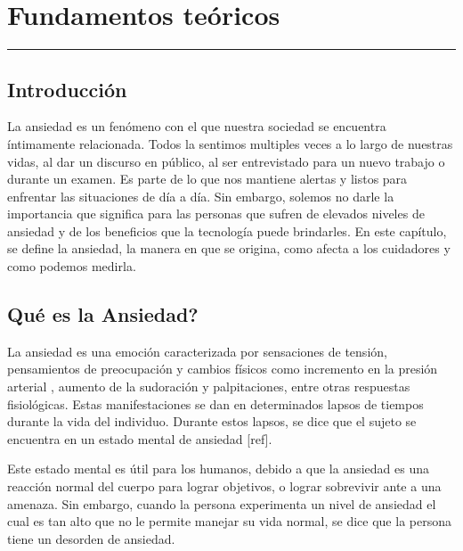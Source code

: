 \chapter{Fundamentos te\'oricos}\label{capit:cap2}
\vspace{-2.0325ex}%
\noindent
\rule{\textwidth}{0.5pt}
\vspace{-5.5ex}%
\newcommand{\pushline}{\Indp}%

\section{Introducci\'on}\label{secc:introduccion}
La ansiedad es un fen\'omeno con el que nuestra sociedad se encuentra \'intimamente relacionada. Todos la sentimos multiples veces a lo largo de nuestras vidas, al dar un discurso en p\'ublico, al ser entrevistado para un nuevo trabajo o durante un examen. Es parte de lo que nos mantiene alertas y listos para enfrentar las situaciones de d\'ia a d\'ia. Sin embargo, solemos no darle la importancia que significa para las personas que sufren de elevados niveles de ansiedad y de los beneficios que la tecnolog\'ia puede brindarles. En este cap\'itulo, se define la ansiedad, la manera en que se origina, como afecta a los cuidadores y como podemos medirla.



\section{Qu\'e es la Ansiedad?}\label{secc:ansiedad}

La ansiedad es una emoci\'on caracterizada por sensaciones de tensi\'on, pensamientos de preocupaci\'on y cambios f\'isicos como incremento en la presi\'on arterial \citep{psychologyapa}, aumento de la sudoraci\'on y palpitaciones, entre otras respuestas fisiol\'ogicas. Estas manifestaciones se dan en determinados lapsos de tiempos durante la vida del individuo. Durante estos lapsos, se dice que el sujeto se encuentra en un estado mental de ansiedad [ref].

Este estado mental es \'util para los humanos, debido a que la ansiedad es una reacci\'on normal del cuerpo para lograr objetivos, o lograr sobrevivir ante a una amenaza. Sin embargo, cuando la persona experimenta un nivel de ansiedad el cual es tan alto que no le permite manejar su vida normal, se dice que la persona tiene un desorden de ansiedad\citep{repetto2013}. 


